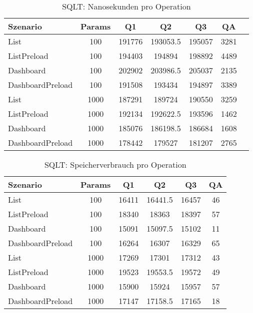 
\begin{table}[ht]
\centering
\caption{SQLT: Nanosekunden pro Operation}
\begin{tabular}{lcccccc}
\toprule
Szenario & Params & Q1 & Q2 & Q3 & QA \\
\midrule
	List & 100 & 191776 & 193053.5 & 195057 & 3281 \\
	ListPreload & 100 & 194403 & 194894 & 198892 & 4489 \\
	Dashboard & 100 & 202902 & 203986.5 & 205037 & 2135 \\
	DashboardPreload & 100 & 191508 & 193434 & 194897 & 3389 \\
	List & 1000 & 187291 & 189724 & 190550 & 3259 \\
	ListPreload & 1000 & 192134 & 192622.5 & 193596 & 1462 \\
	Dashboard & 1000 & 185076 & 186198.5 & 186684 & 1608 \\
	DashboardPreload & 1000 & 178442 & 179527 & 181207 & 2765 \\
\bottomrule
\end{tabular}
\label{tab:benchmark_sqlt_nsperop}
\end{table}
	
\begin{table}[ht]
\centering
\caption{SQLT: Speicherverbrauch pro Operation}
\begin{tabular}{lccccc}
\toprule
Szenario & Params & Q1 & Q2 & Q3 & QA \\
\midrule
	List & 100 & 16411 & 16441.5 & 16457 & 46 \\
	ListPreload & 100 & 18340 & 18363 & 18397 & 57 \\
	Dashboard & 100 & 15091 & 15097.5 & 15102 & 11 \\
	DashboardPreload & 100 & 16264 & 16307 & 16329 & 65 \\
	List & 1000 & 17269 & 17301 & 17312 & 43 \\
	ListPreload & 1000 & 19523 & 19553.5 & 19572 & 49 \\
	Dashboard & 1000 & 15900 & 15924 & 15957 & 57 \\
	DashboardPreload & 1000 & 17147 & 17158.5 & 17165 & 18 \\
\bottomrule
\end{tabular}
\label{tab:benchmark_sqlt_bytesperop}
\end{table}
	
